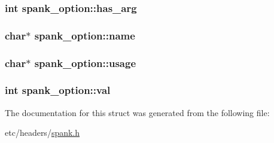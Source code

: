 \subsubsection[{\texorpdfstring{has\+\_\+arg}{has_arg}}]{\setlength{\rightskip}{0pt plus 5cm}int spank\+\_\+option\+::has\+\_\+arg}\hypertarget{structspank__option_af8483ab4b244fe4ef4298696c8599896}{}\label{structspank__option_af8483ab4b244fe4ef4298696c8599896}
\subsubsection[{\texorpdfstring{name}{name}}]{\setlength{\rightskip}{0pt plus 5cm}char$\ast$ spank\+\_\+option\+::name}\hypertarget{structspank__option_a111bd6e521a3012ba63b9040ae08324a}{}\label{structspank__option_a111bd6e521a3012ba63b9040ae08324a}
\subsubsection[{\texorpdfstring{usage}{usage}}]{\setlength{\rightskip}{0pt plus 5cm}char$\ast$ spank\+\_\+option\+::usage}\hypertarget{structspank__option_a16d469d2931e7dd3b70abce25596a247}{}\label{structspank__option_a16d469d2931e7dd3b70abce25596a247}
\subsubsection[{\texorpdfstring{val}{val}}]{\setlength{\rightskip}{0pt plus 5cm}int spank\+\_\+option\+::val}\hypertarget{structspank__option_ae39b3949758fbf1b27a0055f001c67b5}{}\label{structspank__option_ae39b3949758fbf1b27a0055f001c67b5}


The documentation for this struct was generated from the following file\+:\begin{DoxyCompactItemize}
\item 
etc/headers/\hyperlink{spank_8h}{spank.\+h}\end{DoxyCompactItemize}
